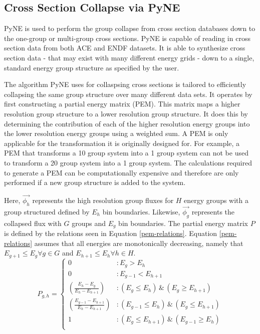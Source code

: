 \documentclass{article}
\begin{document}
\subsection{Cross Section Collapse via PyNE}

PyNE is used to perform the group collapse
from cross section databases down to the one-group or multi-group cross sections.
PyNE is capable of reading in cross section data from both ACE\cite{ace} and ENDF\cite{endf}
datasets. It is able to synthesize cross section data - that may exist with
many different energy grids - down to a single, standard energy group structure as specified
by the user.

The algorithm PyNE uses for collaspsing cross sections is tailored to efficiently collapsing
the same group structure over many different data sets.
It operates by first constructing a partial energy matrix (PEM). This matrix maps a higher
resolution group structure to a lower resolution group structure. It does this by determining
the contribution of each of the higher resolution energy groups into the lower resolution
energy groups using a weighted sum. A PEM is only applicable for the transformation it is
originally designed for. For example, a PEM that transforms a 10 group system into a
1 group system can not be used to transform a 20 group system into a 1 group system.
The calculations required to generate a PEM can be computationally expensive
and therefore are only performed if a new group structure is added to the system.

Here, $\vec{\phi_h}$ represents the high resolution group fluxes for $H$ energy groups with
a group structured defined by $E_h$ bin boundaries. Likewise, $\vec{\phi_g}$ represents
the collapsed flux with $G$ groups and $E_g$ bin boundaries. The partial energy
matrix $P$ is defined by the relations seen in Equation \ref{pem-relations}.
Equation \ref{pem-relations} assumes that all energies are monotonically decreasing, namely
that $E_{g+1} \le E_{g} \forall g\in G$ and $E_{h+1} \le E_{h} \forall h\in H$.
\begin{equation}
\label{pem-relations}
P_{g,h} = \left\{
\begin{array}{ll}
    0 & : E_{g} > E_{h} \\
    0 & : E_{g-1} < E_{h+1} \\
    \left(\frac{E_h - E_g}{E_h - E_{h+1}}\right) & : (E_{g} \le E_h) \, \& \, (E_{g} \ge E_{h+1}) \\
    \left(\frac{E_{g-1} - E_{h+1}}{E_h - E_{h+1}}\right) & : (E_{g-1} \le E_h) \, \& \, (E_{g} \le E_{h+1}) \\
    1 & : (E_{g} \le E_{h+1}) \, \& \, (E_{g-1} \ge E_{h}) \\
\end{array}
\right.
\end{equation}
\end{document}
